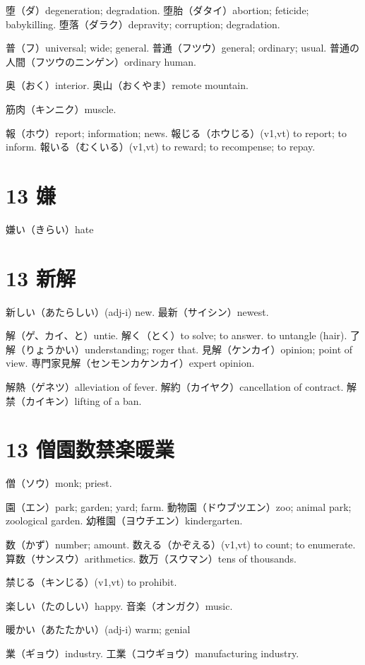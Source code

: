 堕（ダ）degeneration; degradation.
堕胎（ダタイ）abortion; feticide; babykilling.
堕落（ダラク）depravity; corruption; degradation.

普（フ）universal; wide; general.
普通（フツウ）general; ordinary; usual.
普通の人間（フツウのニンゲン）ordinary human.

奥（おく）interior.
奥山（おくやま）remote mountain.

筋肉（キンニク）muscle.

報（ホウ）report; information; news.
報じる（ホウじる）(v1,vt) to report; to inform.
報いる（むくいる）(v1,vt) to reward; to recompense; to repay.

\section{13 嫌}

嫌い（きらい）hate

\section{13 新解}

新しい（あたらしい）(adj-i) new.
最新（サイシン）newest.

解（ゲ、カイ、と）untie.
解く（とく）to solve; to answer. to untangle (hair).
了解（りょうかい）understanding; roger that.
見解（ケンカイ）opinion; point of view.
専門家見解（センモンカケンカイ）expert opinion.

解熱（ゲネツ）alleviation of fever.
解約（カイヤク）cancellation of contract.
解禁（カイキン）lifting of a ban.

\section{13 僧園数禁楽暖業}

僧（ソウ）monk; priest.

園（エン）park; garden; yard; farm.
動物園（ドウブツエン）zoo; animal park; zoological garden.
幼稚園（ヨウチエン）kindergarten.

数（かず）number; amount.
数える（かぞえる）(v1,vt) to count; to enumerate.
算数（サンスウ）arithmetics.
数万（スウマン）tens of thousands.

禁じる（キンじる）(v1,vt) to prohibit.

楽しい（たのしい）happy.
音楽（オンガク）music.

暖かい（あたたかい）(adj-i) warm; genial

業（ギョウ）industry.
工業（コウギョウ）manufacturing industry.

